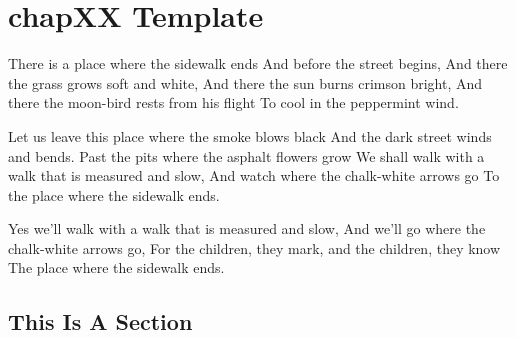 \chapter{chapXX Template}

There is a place where the sidewalk ends
And before the street begins,
And there the grass grows soft and white,
And there the sun burns crimson bright,
And there the moon-bird rests from his flight
To cool in the peppermint wind.

Let us leave this place where the smoke blows black
And the dark street winds and bends.
Past the pits where the asphalt flowers grow
We shall walk with a walk that is measured and slow,
And watch where the chalk-white arrows go
To the place where the sidewalk ends.

Yes we'll walk with a walk that is measured and slow,
And we'll go where the chalk-white arrows go,
For the children, they mark, and the children, they know
The place where the sidewalk ends.

\section{This Is A Section}

